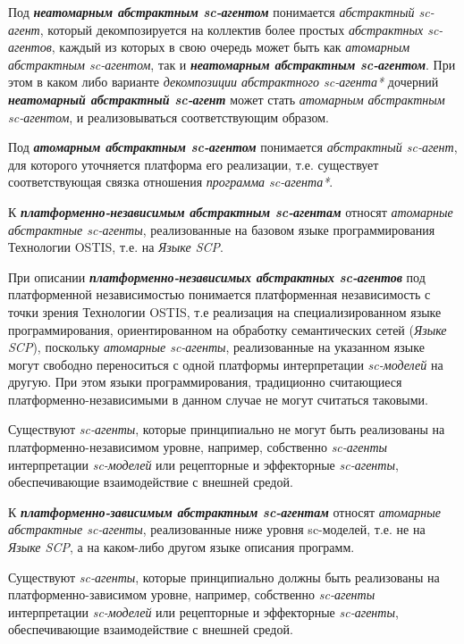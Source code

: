 Под \textbf{\textit{неатомарным абстрактным sc-агентом}} понимается \textit{абстрактный sc-агент}, который декомпозируется на коллектив более простых \textit{абстрактных sc-агентов}, каждый из которых в свою очередь может быть как \textit{атомарным абстрактным sc-агентом}, так и \textbf{\textit{неатомарным абстрактным sc-агентом}}. При этом в каком либо варианте \textit{декомпозиции абстрактного sc-агента*} дочерний \textbf{\textit{неатомарный абстрактный sc-агент}} может стать \textit{атомарным абстрактным sc-агентом}, и реализовываться соответствующим образом.

Под \textbf{\textit{атомарным абстрактным sc-агентом}} понимается \textit{абстрактный sc-агент}, для которого уточняется платформа его реализации, т.е. существует соответствующая связка отношения \textit{программа sc-агента*}.

К \textbf{\textit{платформенно-независимым абстрактным \mbox{sc-агентам}}} относят \textit{атомарные абстрактные sc-агенты}, реализованные на базовом языке программирования Технологии OSTIS, т.е. на \textit{Языке SCP}.
	
При описании \textbf{\textit{платформенно-независимых абстрактных sc-агентов}} под платформенной независимостью понимается платформенная независимость с точки зрения Технологии OSTIS, т.е реализация на специализированном языке программирования, ориентированном на обработку семантических сетей (\textit{Языке SCP}), поскольку \textit{атомарные sc-агенты}, реализованные на указанном языке могут свободно переноситься с одной платформы интерпретации \textit{sc-моделей} на другую. При этом языки программирования, традиционно считающиеся платформенно-независимыми в данном случае не могут считаться таковыми.
	
Существуют \textit{sc-агенты}, которые принципиально не могут быть реализованы на платформенно-независимом уровне, например, собственно \textit{sc-агенты} интерпретации \textit{sc-моделей} или рецепторные и эффекторные \textit{sc-агенты}, обеспечивающие взаимодействие с внешней средой.

К \textbf{\textit{платформенно-зависимым абстрактным sc-агентам}} относят \textit{атомарные абстрактные sc-агенты}, реализованные ниже уровня sc-моделей, т.е. не на \textit{Языке SCP}, а на каком-либо другом языке описания программ.
	
Существуют \textit{sc-агенты}, которые принципиально должны быть реализованы на платформенно-зависимом уровне, например, собственно \textit{sc-агенты} интерпретации \textit{sc-моделей} или рецепторные и эффекторные \textit{sc-агенты}, обеспечивающие взаимодействие с внешней средой.

